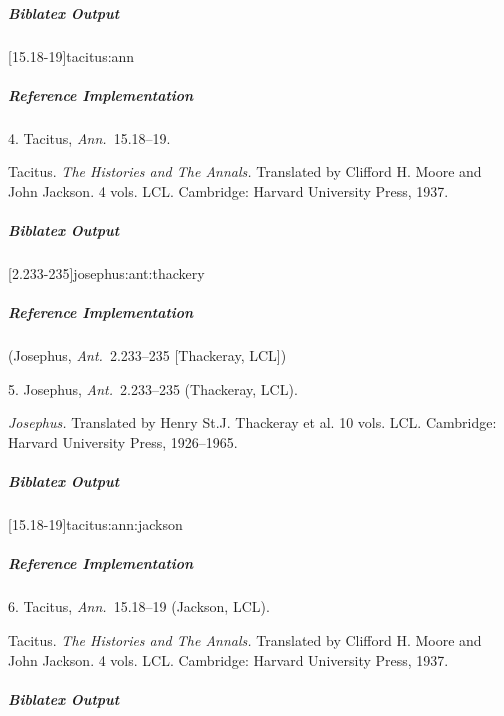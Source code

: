 \documentclass[a4paper]{article}
\newenvironment{biboutput}{%
  \subparagraph{Biblatex Output}
}{\color{black}}
\newenvironment{refimp}{%
  \subparagraph{Reference Implementation}
  \color{reference-colour}
  \rm
}{\par\color{black}}
\begin{document}
\begin{biboutput}
  [15.18-19]{tacitus:ann}
\end{biboutput}

\begin{refimp}
  \hspace*{\bibindent}4. Tacitus, \emph{Ann.}\ 15.18–19.

  \hangindent\bibindent Tacitus. \emph{The Histories and The Annals.}
  Translated by Clifford H. Moore and John Jackson. 4 vols. LCL. Cambridge:
  Harvard University Press, 1937.

\end{refimp}

\begin{biboutput}
  [2.233-235]{josephus:ant:thackery}
\end{biboutput}

\begin{refimp}
  (Josephus, \emph{Ant.}\ 2.233–235 [Thackeray, LCL])

  \hspace*{\bibindent}5. Josephus, \emph{Ant.}\ 2.233–235 (Thackeray, LCL).

  \hangindent\bibindent \emph{Josephus.} Translated by Henry St.\@ J.
  Thackeray et al. 10 vols. LCL. Cambridge: Harvard University Press,
  1926–1965.

\end{refimp}

\begin{biboutput}
  [15.18-19]{tacitus:ann:jackson}
\end{biboutput}

\begin{refimp}
  \hspace*{\bibindent}6. Tacitus, \emph{Ann.}\ 15.18–19 (Jackson, LCL).

  \hangindent\bibindent Tacitus. \emph{The Histories and The Annals.}
  Translated by Clifford H. Moore and John Jackson. 4 vols. LCL. Cambridge:
  Harvard University Press, 1937.

\end{refimp}

\begin{biboutput}
\end{biboutput}
\end{document}
